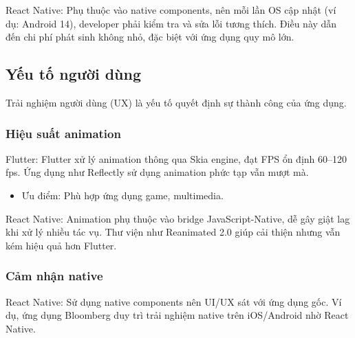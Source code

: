     \begin{flushleft}
      \hspace*{0.8cm}React Native: Phụ thuộc vào native components, nên mỗi lần OS cập nhật (ví dụ: Android 14), developer phải kiểm tra và sửa lỗi tương thích. Điều này dẫn đến chi phí phát sinh không nhỏ, đặc biệt với ứng dụng quy mô lớn.
    \end{flushleft}

\subsection{Yếu tố người dùng}
\renewcommand{\labelitemi}{--}    
    \begin{flushleft}
        \hspace*{0.8cm}Trải nghiệm người dùng (UX) là yếu tố quyết định sự thành công của ứng dụng.
    \end{flushleft}

    \subsubsection{Hiệu suất animation}
    \begin{flushleft}
      \hspace*{0.8cm}Flutter: Flutter xử lý animation thông qua Skia engine, đạt FPS ổn định 60–120 fps. Ứng dụng như Reflectly sử dụng animation phức tạp vẫn mượt mà.
      \setlength{\leftmargini}{1.5cm}
      \begin{itemize}
        \item Ưu điểm: Phù hợp ứng dụng game, multimedia.
      \end{itemize}
    \end{flushleft}

    \begin{flushleft}
      \hspace*{0.8cm}React Native: Animation phụ thuộc vào bridge JavaScript-Native, dễ gây giật lag khi xử lý nhiều tác vụ. Thư viện như Reanimated 2.0 giúp cải thiện nhưng vẫn kém hiệu quả hơn Flutter.
    \end{flushleft}

    \subsubsection{Cảm nhận native}
    \begin{flushleft}
      \hspace*{0.8cm}React Native: Sử dụng native components nên UI/UX sát với ứng dụng gốc. Ví dụ, ứng dụng Bloomberg duy trì trải nghiệm native trên iOS/Android nhờ React Native.
    \end{flushleft}

